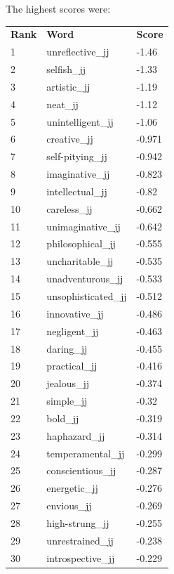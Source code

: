 \documentclass[10pt,letterpaper]{book}
\begin{document}
The highest scores were:
\begin{tabular}{ l l l }
        \textbf{Rank} & \textbf{Word} & \textbf{Score} \\
        1 & unreflective\_jj & -1.46 \\
        2 & selfish\_jj & -1.33 \\
        3 & artistic\_jj & -1.19 \\
        4 & neat\_jj & -1.12 \\
        5 & unintelligent\_jj & -1.06 \\
        6 & creative\_jj & -0.971 \\
        7 & self-pitying\_jj & -0.942 \\
        8 & imaginative\_jj & -0.823 \\
        9 & intellectual\_jj & -0.82 \\
        10 & careless\_jj & -0.662 \\
        11 & unimaginative\_jj & -0.642 \\
        12 & philosophical\_jj & -0.555 \\
        13 & uncharitable\_jj & -0.535 \\
        14 & unadventurous\_jj & -0.533 \\
        15 & unsophisticated\_jj & -0.512 \\
        16 & innovative\_jj & -0.486 \\
        17 & negligent\_jj & -0.463 \\
        18 & daring\_jj & -0.455 \\
        19 & practical\_jj & -0.416 \\
        20 & jealous\_jj & -0.374 \\
        21 & simple\_jj & -0.32 \\
        22 & bold\_jj & -0.319 \\
        23 & haphazard\_jj & -0.314 \\
        24 & temperamental\_jj & -0.299 \\
        25 & conscientious\_jj & -0.287 \\
        26 & energetic\_jj & -0.276 \\
        27 & envious\_jj & -0.269 \\
        28 & high-strung\_jj & -0.255 \\
        29 & unrestrained\_jj & -0.238 \\
        30 & introspective\_jj & -0.229 \\
\end{tabular}
\end{document}
